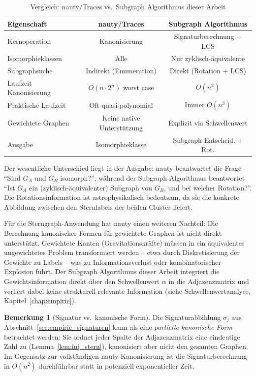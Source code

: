 ﻿\documentclass[a4paper,12pt]{report}
\theoremstyle{definition}
\newtheorem{bemerkung}{Bemerkung}
\begin{document}
\begin{table}[H]
\centering
\caption{Vergleich: nauty/Traces vs.\ Subgraph Algorithmus dieser Arbeit}
\label{tab:nauty}
\begin{tabular}{lcc}
\toprule
Eigenschaft & nauty/Traces & Subgraph Algorithmus \\
\midrule
Kernoperation           & Kanonisierung              & Signaturberechnung + LCS \\
Isomorphieklassen       & Alle                        & Nur zyklisch-äquivalente \\
Subgraphsuche           & Indirekt (Enumeration)      & Direkt (Rotation + LCS) \\
Laufzeit Kanonisierung  & $O(n \cdot 2^n)$ worst case & $O(n^2)$ \\
Praktische Laufzeit     & Oft quasi-polynomial        & Immer $O(n^3)$ \\
Gewichtete Graphen      & Keine native Unterstützung  & Explizit via Schwellenwert \\
Ausgabe                 & Isomorphieklasse            & Subgraph-Entscheid. + Rot. \\
\bottomrule
\end{tabular}
\end{table}

Der wesentliche Unterschied liegt in der Ausgabe: nauty beantwortet die Frage ``Sind $G_A$ und $G_B$ isomorph?'', während der Subgraph Algorithmus beantwortet ``Ist $G_A$ ein (zyklisch-äquivalenter) Subgraph von $G_B$, und bei welcher Rotation?''. Die Rotationsinformation ist astrophysikalisch bedeutsam, da sie die konkrete Abbildung zwischen den Sternlabels der beiden Cluster liefert.

Für die Sterngraph-Anwendung hat nauty einen weiteren Nachteil: Die Berechnung kanonischer Formen für gewichtete Graphen ist nicht direkt unterstützt. Gewichtete Kanten (Gravitationskräfte) müssen in ein äquivalentes ungewichtetes Problem transformiert werden -- etwa durch Diskretisierung der Gewichte zu Labels -- was zu Informationsverlust oder kombinatorischer Explosion führt. Der Subgraph Algorithmus dieser Arbeit integriert die Gewichtsinformation direkt über den Schwellenwert $\alpha$ in die Adjazenzmatrix und verliert dabei keine strukturell relevante Information (siehe Schwellenwertanalyse, Kapitel~\ref{chap:empirie}).

\begin{bemerkung}[Signatur vs.\ kanonische Form]
Die Signaturabbildung $\sigma_j$ aus Abschnitt~\ref{sec:empirie_signaturen} kann als eine \emph{partielle kanonische Form} betrachtet werden: Sie ordnet jeder Spalte der Adjazenzmatrix eine eindeutige Zahl zu (Lemma~\ref{lem:inj_stern}), kanonisiert aber nicht den gesamten Graphen. Im Gegensatz zur vollständigen nauty-Kanonisierung ist die Signaturberechnung in $O(n^2)$ durchführbar statt in potenziell exponentieller Zeit.
\end{bemerkung}
\end{document}
